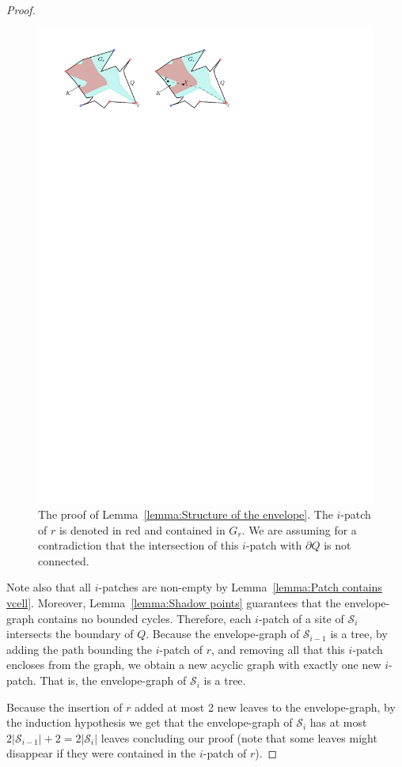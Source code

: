 \documentclass[a4paper, 11pt]{article}
\newcommand{\icell}[1][i]{${#1}$-patch\xspace}
\newcommand{\icells}[1][i]{${#1}$-patches\xspace}
\newcommand{\s}{\mathcal S}
\begin{document}
\begin{proof}
\begin{figure}[ht]
\centering
\includegraphics{imgEnvelopeGraph.pdf}
\caption{The proof of Lemma~\ref{lemma:Structure of the envelope}. The \icell of $r$ is denoted in red and contained in $G_r$. We are assuming for a contradiction that the intersection of this \icell with $\partial Q$ is not connected.}
\label{fig:EnvelopeGraph}
\end{figure}

Note also that all \icells are non-empty by Lemma~\ref{lemma:Patch contains vcell}.
Moreover, Lemma~\ref{lemma:Shadow points} guarantees that the envelope-graph contains no bounded cycles. 
Therefore, each \icell of a site of $\s_i$ intersects the boundary of $Q$. 
Because the envelope-graph of $\s_{i-1}$ is a tree, by adding the path bounding the \icell of $r$, and removing all that this \icell encloses from the graph,
we obtain a new acyclic graph with exactly one new \icell. That is, the envelope-graph of $\s_i$ is a tree.

Because the insertion of $r$ added at most 2 new leaves to the envelope-graph, by the induction hypothesis we get that the envelope-graph of $\s_i$ has at most $2|\s_{i-1}| + 2 = 2|\s_i|$ leaves concluding our proof (note that some leaves might disappear if they were contained in the \icell of $r$).
\end{proof}
\end{document}
